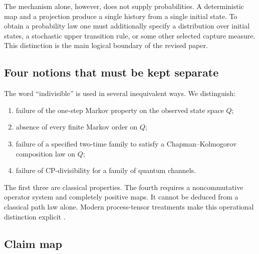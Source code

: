 \documentclass[11pt]{article}
\theoremstyle{definition}
\theoremstyle{remark}
\begin{document}
The mechanism alone, however, does not supply probabilities.  A deterministic
map and a projection produce a single history from a single initial state.
To obtain a probability law one must additionally specify a distribution over
initial states, a stochastic upper transition rule, or some other selected
capture measure.  This distinction is the main logical boundary of the
revised paper.

\subsection{Four notions that must be kept separate}

The word ``indivisible'' is used in several inequivalent ways.  We distinguish:

\begin{enumerate}[label=(\roman*)]
\item failure of the one-step Markov property on the observed state space
  \(Q\);
\item absence of every finite Markov order on \(Q\);
\item failure of a specified two-time family to satisfy a
  Chapman--Kolmogorov composition law on \(Q\);
\item failure of CP-divisibility for a family of quantum channels.
\end{enumerate}

The first three are classical properties.  The fourth requires a
noncommutative operator system and completely positive maps.  It cannot be
deduced from a classical path law alone.  Modern process-tensor treatments
make this operational distinction explicit
\cite{pollock2018framework,pollock2018markov,rivas2010}.

\subsection{Claim map}
\end{document}
